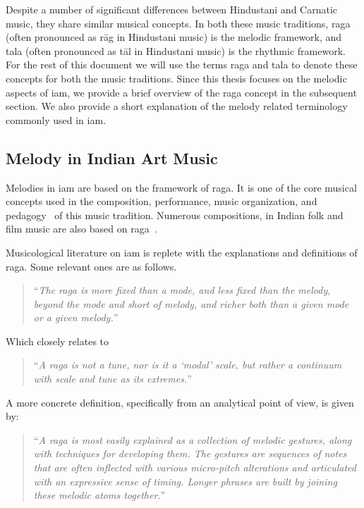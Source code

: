 Despite a number of significant differences between Hindustani and Carnatic music, they share similar musical concepts. In both these music traditions, \gls{raga} (often pronounced as r\={a}g in Hindustani music) is the melodic framework, and \gls{tala} (often pronounced as t\={a}l in Hindustani music) is the rhythmic framework. For the rest of this document we will use the terms \gls{raga} and \gls{tala} to denote these concepts for both the music traditions. Since this thesis focuses on the melodic aspects of \gls{iam}, we provide a brief overview of the \gls{raga} concept in the subsequent section. We also provide a short explanation of the melody related terminology commonly used in \gls{iam}. 


\subsection{Melody in Indian Art Music}
\label{sec:melody_in_iam}

Melodies in \gls{iam} are based on the framework of \gls{raga}. It is one of the core musical concepts used in the composition, performance, music organization, and pedagogy~\citep{Bagchee1998,Danielou2010} of this music tradition. Numerous compositions, in Indian folk and film music are also based on \gls{raga}~\citep{ganti2013bollywood}.

Musicological literature on \gls{iam} is replete with the explanations and definitions of \gls{raga}. Some relevant ones are as follows.

\blockcquote[p. 96]{martinez2001semiosis}{``\textit{The \gls{raga} is more fixed than a mode, and less fixed than the melody, beyond the mode and short of melody, and richer both than a given mode or a given melody.}''}

Which closely relates to

\blockcquote[]{powers1963background}{``\textit{A \gls{raga} is not a tune, nor is it a `modal' scale, but rather a continuum with scale and tune as its extremes.}''}

A more concrete definition, specifically from an analytical point of view, is given by:

\blockcquote[]{chordia2013joint}{``\textit{A \gls{raga} is most easily explained as a collection of melodic gestures, along with techniques for developing them. The gestures are sequences of notes that are often inflected with various micro-pitch alterations and articulated with an expressive sense of timing. Longer phrases are built by joining these melodic atoms together.}''}

